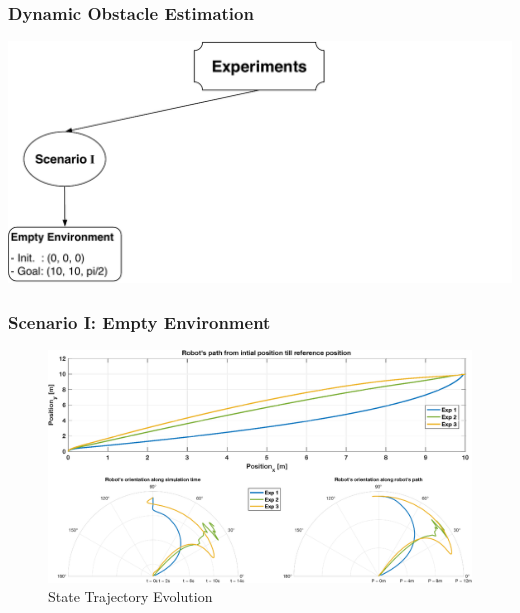 	\begin{frame}
		\frametitle{Dynamic Obstacle Estimation}
		\centering
	\end{frame}
	
	\begin{frame}
		\centering
		\includegraphics[scale=0.7]{pictures/eperiments_1.pdf}
	\end{frame}
	
	\begin{frame}
		\frametitle{Scenario \textrm{I}: Empty Environment}
		\begin{figure}[hbtp]
			\centering
			\includegraphics[scale=0.45]{pictures/graphs/sn1_states.eps}
			\caption{State Trajectory Evolution}
		\end{figure}
	\end{frame}

